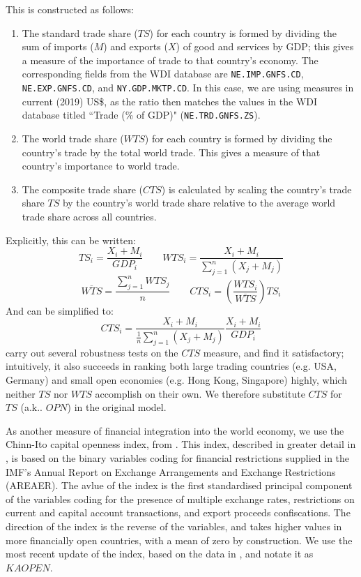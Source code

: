 \documentclass[12pt,a4paper]{article}
\begin{document}
This is constructed as follows:
\begin{enumerate}
\item The standard trade share ($TS$) for each country is formed by dividing the sum of imports ($M$) and exports ($X$) of good and services by GDP; this gives a measure of the importance of trade to that country's economy.
The corresponding fields from the WDI database are \texttt{NE.IMP.GNFS.CD}, \texttt{NE.EXP.GNFS.CD}, and \texttt{NY.GDP.MKTP.CD}.
In this case, we are using measures in current (2019) US\$, as the ratio then matches the values in the WDI database titled ``Trade (\% of GDP)" (\texttt{NE.TRD.GNFS.ZS}).
\item The world trade share ($WTS$) for each country is formed by dividing the country's trade by the total world trade. 
This gives a measure of that country's importance to world trade.
\item The composite trade share ($CTS$) is calculated by scaling the country's trade share $TS$ by the country's world trade share relative to the average world trade share across all countries.
\end{enumerate}

Explicitly, this can be written:
\begin{equation*}
TS_i = \frac{X_i + M_i}{GDP_i}
\qquad
WTS_i = \frac{X_i + M_i}{\sum_{j=1}^{n} ( X_j + M_j )}
\end{equation*}
\begin{equation*}
\overline{WTS} = \frac{\sum_{j=1}^{n} WTS_j}{n}
\qquad
CTS_i = \left( \frac{WTS_i}{\overline{WTS}} \right) TS_i
\end{equation*}
And can be simplified to:
\begin{equation}
CTS_i = \frac{X_i + M_i}{\frac{1}{n} \sum_{j=1}^{n} ( X_j + M_j )} \frac{X_i + M_i}{GDP_i}
\end{equation}
\cite{squalliNewMeasureTrade2011} carry out several robustness tests on the $CTS$ measure, and find it satisfactory; intuitively, it also succeeds in ranking both large trading countries (e.g. USA, Germany) and small open economies (e.g. Hong Kong, Singapore) highly, which neither $TS$ nor $WTS$ accomplish on their own.
We therefore substitute $CTS$ for $TS$ (a.k.. $OPN$) in the original model.

As another measure of financial integration into the world economy, we use the Chinn-Ito capital openness index, from \cite{chinnWhatMattersFinancial2006}.
This index, described in greater detail in \cite{chinnNewMeasureFinancial2008}, is based on the binary variables coding for financial restrictions supplied in the IMF's Annual Report on Exchange Arrangements and Exchange Restrictions (AREAER).
The avlue of the index is the first standardised principal component of the variables coding for the presence of multiple exchange rates, restrictions on current and capital account transactions, and export proceeds confiscations.
The direction of the index is the reverse of the variables, and takes higher values in more financially open countries, with a mean of zero by construction.
We use the most recent update of the index, based on the data in \cite{imfAnnualReportExchange2019}, and notate it as $KAOPEN$.
\end{document}
